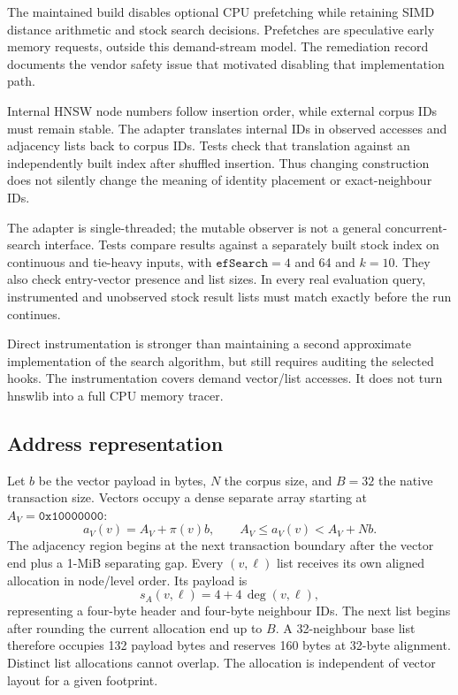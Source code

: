 \documentclass[11pt,a4paper]{report}
\begin{document}
The maintained build disables optional CPU prefetching while retaining SIMD distance arithmetic and stock search decisions. Prefetches are speculative early memory requests, outside this demand-stream model. The remediation record documents the vendor safety issue that motivated disabling that implementation path.

Internal HNSW node numbers follow insertion order, while external corpus IDs must remain stable. The adapter translates internal IDs in observed accesses and adjacency lists back to corpus IDs. Tests check that translation against an independently built index after shuffled insertion. Thus changing construction does not silently change the meaning of identity placement or exact-neighbour IDs.

The adapter is single-threaded; the mutable observer is not a general concurrent-search interface. Tests compare results against a separately built stock index on continuous and tie-heavy inputs, with $\texttt{efSearch}=4$ and 64 and $k=10$. They also check entry-vector presence and list sizes. In every real evaluation query, instrumented and unobserved stock result lists must match exactly before the run continues.

Direct instrumentation is stronger than maintaining a second approximate implementation of the search algorithm, but still requires auditing the selected hooks. The instrumentation covers demand vector/list accesses. It does not turn hnswlib into a full CPU memory tracer.

\subsection{Address representation}
Let $b$ be the vector payload in bytes, $N$ the corpus size, and $B=32$ the native transaction size. Vectors occupy a dense separate array starting at $A_V=\mathtt{0x10000000}$:
\begin{equation}
 a_V(v)=A_V+\pi(v)b,\qquad A_V\leq a_V(v)<A_V+Nb.
\end{equation}
The adjacency region begins at the next transaction boundary after the vector end plus a 1-MiB separating gap. Every $(v,\ell)$ list receives its own aligned allocation in node/level order. Its payload is
\begin{equation}
 s_A(v,\ell)=4+4\,\deg(v,\ell),
\end{equation}
representing a four-byte header and four-byte neighbour IDs. The next list begins after rounding the current allocation end up to $B$. A 32-neighbour base list therefore occupies 132 payload bytes and reserves 160 bytes at 32-byte alignment. Distinct list allocations cannot overlap. The allocation is independent of vector layout for a given footprint.
\end{document}
